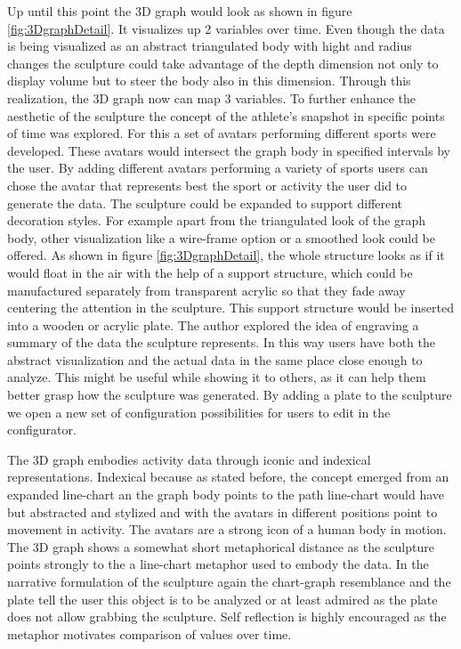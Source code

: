 \documentclass[../medieninformatik-arbeit.tex]{subfiles}
\begin{document}
Up until this point the 3D graph would look as shown in figure \ref{fig:3DgraphDetail}. It visualizes up 2 variables over time. Even though the data is being visualized as an abstract triangulated body with hight and radius changes the sculpture could take advantage of the depth dimension not only to display volume but to steer the body also in this dimension. Through this realization, the 3D graph now can map 3 variables. To further enhance the aesthetic of the sculpture the concept of the athlete's snapshot in specific points of time was explored. For this a set of avatars performing different sports were developed. These avatars would intersect the graph body in specified intervals by the user. By adding different avatars performing a variety of sports users can chose the avatar that represents best the sport or activity the user did to generate the data. The sculpture could be expanded to support different decoration styles. For example apart from the triangulated look of the graph body, other visualization like a wire-frame option or a smoothed look could be offered. 
As shown in figure \ref{fig:3DgraphDetail}, the whole structure looks as if it would float in the air with the help of a support structure, which could be manufactured separately from transparent acrylic  so that they fade away centering the attention in the sculpture. This support structure would be inserted into a wooden or acrylic plate. The author explored the idea of engraving a summary of the data the sculpture represents. In this way users have both the abstract visualization and the actual data in the same place close enough to analyze. This might be useful while showing it to others, as it can help them better grasp how the sculpture was generated. By adding a plate to the sculpture we open a new set of configuration possibilities for users to edit in the configurator. 

The 3D graph embodies activity data through iconic and indexical representations. Indexical because as stated before, the concept emerged from an expanded line-chart an the graph body points to the path line-chart would have but abstracted and stylized and with the avatars in different positions point to movement in activity. The avatars are a strong icon of a human body in motion. The 3D graph shows a somewhat short metaphorical distance as the sculpture points strongly to the a line-chart metaphor used to embody the data. In the narrative formulation of the sculpture again the chart-graph resemblance and the plate tell the user this object is to be analyzed or at least admired as the plate does not allow grabbing the sculpture. Self reflection is highly encouraged as the metaphor motivates comparison of values over time. 
\end{document}
